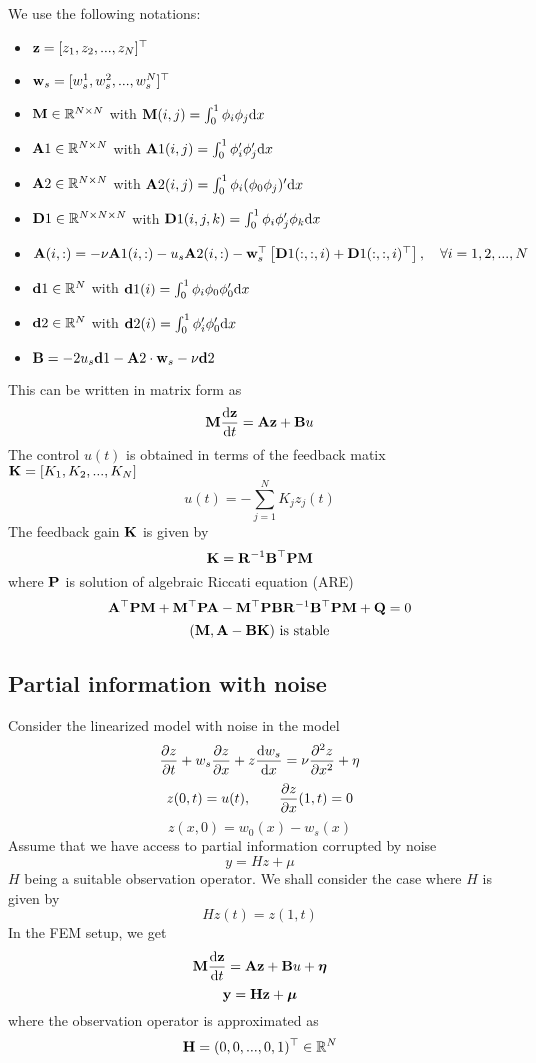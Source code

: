 \documentclass[12pt]{article}
\begin{document}
 We use the following notations:
\begin{itemize}
 \item ${\mathbf z} = [z_1,z_2,...,z_N]^\top$
 \item ${\mathbf w}_s = [w_s^1,w_s^2,...,w_s^N]^\top$
 \item ${\mathbf M} \in \mathbb{R}^{N \times N}$ with ${\mathbf M}(i,j) = \int_0^1 \phi_i\phi_j \textrm{d} x$
 \item ${\mathbf A}1 \in \mathbb{R}^{N \times N}$ with ${\mathbf A}1(i,j) = \int_0^1 \phi_i'\phi_j' \textrm{d} x$
 \item ${\mathbf A}2 \in \mathbb{R}^{N \times N}$ with ${\mathbf A}2(i,j) = \int_0^1 \phi_i(\phi_0 \phi_j)' \textrm{d} x$
 \item ${\mathbf D}1 \in \mathbb{R}^{N \times N \times N}$ with ${\mathbf D}1(i,j,k) = \int_0^1 \phi_i \phi_j' \phi_k \textrm{d} x$
 \item ${\mathbf A}(i,:) = - \nu {\mathbf A}1(i,:) -u_s {\mathbf A}2(i,:) - {\mathbf w}_s^\top \left[ {\mathbf D}1(:,:,i) + {\mathbf D}1(:,:,i)^\top \right], \quad \forall i = 1,2,...,N $
 \item ${\mathbf d}1 \in \mathbb{R}^{N}$ with ${\mathbf d}1(i) = \int_0^1 \phi_i \phi_0 \phi_0' \textrm{d} x$
 \item ${\mathbf d}2 \in \mathbb{R}^{N}$ with ${\mathbf d}2(i) = \int_0^1 \phi_i'\phi_0' \textrm{d} x$
 \item ${\mathbf B} = -2 u_s {\mathbf d}1 - {\mathbf A}2 \cdot {\mathbf w}_s - \nu {\mathbf d}2$
\end{itemize}
This can be written in matrix form as
\[
{\mathbf M} \frac{\textrm{d} {\mathbf z}}{\textrm{d} t} = {\mathbf A} {\mathbf z} + {\mathbf B} u
\]
The control $u(t)$ is obtained in terms of the feedback matix ${\mathbf K} = [K_1, K_2, ..., K_N]$ 
\[
 u(t) = - \sum_{j=1}^N K_j z_j(t)
\]
The feedback gain ${\mathbf K}$ is given by
\[
{\mathbf K} = {\mathbf R}^{-1} {\mathbf B}^\top {\mathbf P} {\mathbf M}
\]
where ${\mathbf P}$ is solution of algebraic Riccati equation (ARE)
\[
{\mathbf A}^\top {\mathbf P} {\mathbf M} + {\mathbf M}^\top {\mathbf P} {\mathbf A} - {\mathbf M}^\top {\mathbf P} {\mathbf B} {\mathbf R}^{-1} {\mathbf B}^\top {\mathbf P} {\mathbf M} + {\mathbf Q}  = 0
\]
\[
 ({\mathbf M},{\mathbf A} - {\mathbf B} {\mathbf K}) \text{ is stable} 
\]

\subsection{Partial information with noise}
Consider the linearized model with noise in the model
\begin{equation}
\frac{\partial z}{\partial t} + w_s \frac{\partial z}{\partial x} + z \frac{\textrm{d} w_s}{\textrm{d} x} = \nu \frac{\partial ^2 z}{\partial x^2} + \eta
\end{equation}
\begin{equation}
z(0,t) = u(t), \qquad \frac{\partial z}{\partial x}(1,t) = 0
\end{equation}
\begin{equation}
z(x,0) = w_0(x) - w_s(x)
\end{equation}
Assume that we have access to partial information corrupted by noise
\[
y = Hz + \mu
\]
$H$ being a suitable observation operator. We shall consider the case where $H$ is given by
\[
 Hz(t) = z(1,t)
\]
In the FEM setup, we get
\[
 {\mathbf M} \frac{\textrm{d} {\mathbf z}}{\textrm{d} t} = {\mathbf A} {\mathbf z} + {\mathbf B} u + \boldsymbol\eta 
\]
\[
 {\mathbf y} = {\mathbf H} {\mathbf z} + \boldsymbol\mu
\]
where the observation operator is approximated as
\[
 {\mathbf H} = (0,0,...,0,1)^\top \in \mathbb{R}^{N}
\]
\end{document}

